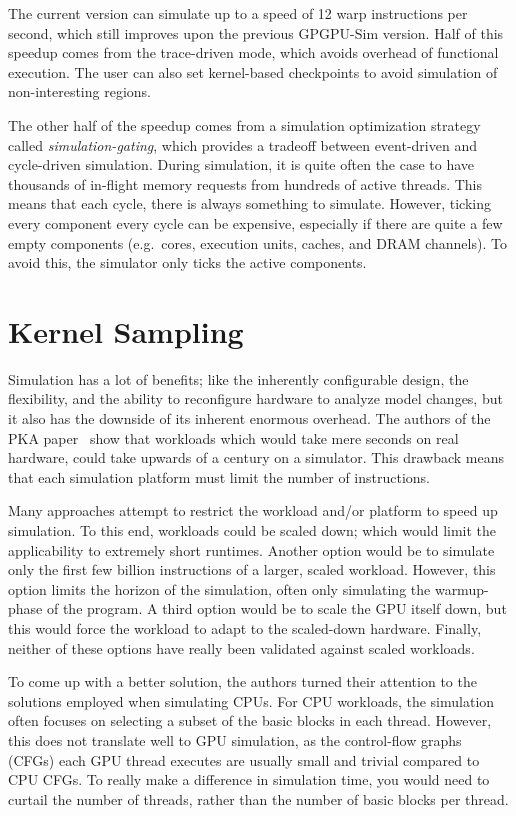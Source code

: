 The current version can simulate up to a speed of 12 warp instructions per second, which still improves upon the previous GPGPU-Sim version.
Half of this speedup comes from the trace-driven mode, which avoids overhead of functional execution.
The user can also set kernel-based checkpoints to avoid simulation of non-interesting regions.

The other half of the speedup comes from a simulation optimization strategy called \textit{simulation-gating}, which provides a tradeoff between event-driven and cycle-driven simulation.
During simulation, it is quite often the case to have thousands of in-flight memory requests from hundreds of active threads.
This means that each cycle, there is always something to simulate.
However, ticking every component every cycle can be expensive, especially if there are quite a few empty components (e.g.\ cores, execution units, caches, and DRAM channels).
To avoid this, the simulator only ticks the active components.

\section{Kernel Sampling}\label{sec:kernel-sampling}
Simulation has a lot of benefits; like the inherently configurable design, the flexibility, and the ability to reconfigure hardware to analyze model changes, but it also has the downside of its inherent enormous overhead.
The authors of the PKA paper~\cite{pks} show that workloads which would take mere seconds on real hardware, could take upwards of a century on a simulator.
This drawback means that each simulation platform must limit the number of instructions.

Many approaches attempt to restrict the workload and/or platform to speed up simulation.
To this end, workloads could be scaled down; which would limit the applicability to extremely short runtimes.
Another option would be to simulate only the first few billion instructions of a larger, scaled workload.
However, this option limits the horizon of the simulation, often only simulating the warmup-phase of the program.
A third option would be to scale the GPU itself down, but this would force the workload to adapt to the scaled-down hardware.
Finally, neither of these options have really been validated against scaled workloads.

To come up with a better solution, the authors turned their attention to the solutions employed when simulating CPUs.
For CPU workloads, the simulation often focuses on selecting a subset of the basic blocks in each thread.
However, this does not translate well to GPU simulation, as the control-flow graphs (CFGs) each GPU thread executes are usually small and trivial compared to CPU CFGs.
To really make a difference in simulation time, you would need to curtail the number of threads, rather than the number of basic blocks per thread.

